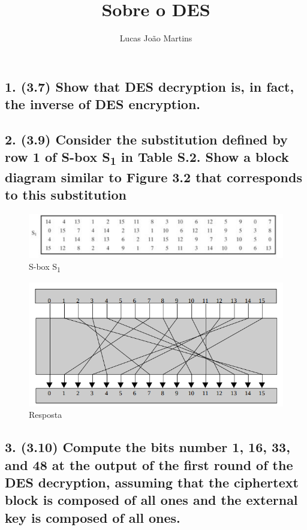 \documentclass[12pt]{article}
\title{Sobre o DES}
\author{Lucas João Martins}
\date{}
\begin{document}
\maketitle

\section*{}
\subsection*{1. (3.7) Show that DES decryption is, in fact, the inverse of DES
encryption.}


\subsection*{2. (3.9) Consider the substitution defined by row 1 of S-box
S\textsubscript{1} in Table S.2. Show a block diagram similar to Figure 3.2 that
corresponds to this substitution}

  \begin{figure}[h]
    \includegraphics[width=\linewidth]{des_block_substitution}
    \caption{S-box S\textsubscript{1}}
  \end{figure}

  \begin{figure}[h]
    \includegraphics[width=\linewidth]{des_block_diagram}
    \caption{Resposta}
  \end{figure}

\subsection*{3. (3.10) Compute the bits number 1, 16, 33, and 48 at the output
of the first round of the DES decryption, assuming that the ciphertext block is
composed of all ones and the external key is composed of all ones.}
\end{document}
